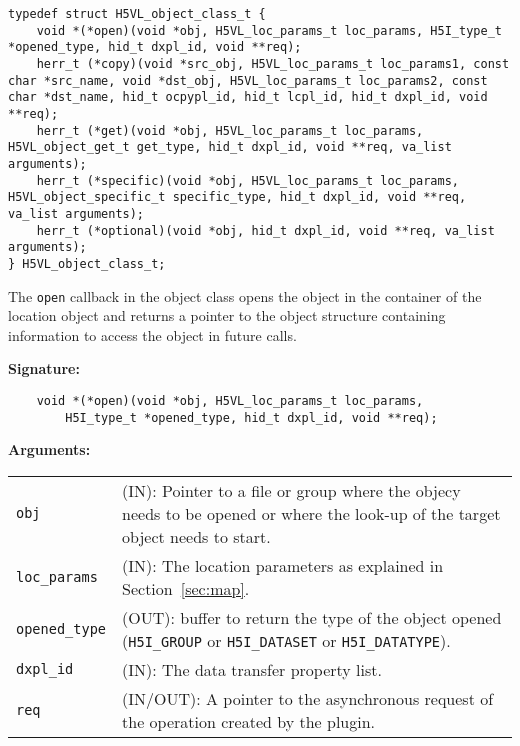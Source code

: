 \begin{lstlisting}[caption={Structure for object callback routines, H5VLpublic.h}, captionpos=b, label={lst:H5Oclass}]
typedef struct H5VL_object_class_t {
    void *(*open)(void *obj, H5VL_loc_params_t loc_params, H5I_type_t *opened_type, hid_t dxpl_id, void **req);
    herr_t (*copy)(void *src_obj, H5VL_loc_params_t loc_params1, const char *src_name, void *dst_obj, H5VL_loc_params_t loc_params2, const char *dst_name, hid_t ocpypl_id, hid_t lcpl_id, hid_t dxpl_id, void **req);
    herr_t (*get)(void *obj, H5VL_loc_params_t loc_params, H5VL_object_get_t get_type, hid_t dxpl_id, void **req, va_list arguments);
    herr_t (*specific)(void *obj, H5VL_loc_params_t loc_params, H5VL_object_specific_t specific_type, hid_t dxpl_id, void **req, va_list arguments);
    herr_t (*optional)(void *obj, hid_t dxpl_id, void **req, va_list arguments);
} H5VL_object_class_t;
\end{lstlisting}

The \texttt{open} callback in the object class opens the object in
the container of the location object and returns a pointer to the
object structure containing information to access the object in future
calls.\bigskip

\begin{mdframed}[style=bgbox]
\textbf{Signature:}
\begin{lstlisting}
    void *(*open)(void *obj, H5VL_loc_params_t loc_params, 
        H5I_type_t *opened_type, hid_t dxpl_id, void **req);
\end{lstlisting}

\textbf{Arguments:}\\
\begin{tabular}{l p{13.5cm}}
  \texttt{obj} & (IN): Pointer to a file or group where the objecy needs to be
  opened or where the look-up of the target object needs to start.\\
  \texttt{loc\_params} & (IN): The location parameters as explained in
  Section~\ref{sec:map}.\\
  \texttt{opened\_type} & (OUT): buffer to return the type of the object
  opened (\texttt{H5I\_GROUP} or \texttt{H5I\_DATASET} or \texttt{H5I\_DATATYPE}).\\
  \texttt{dxpl\_id} & (IN): The data transfer property list.\\
  \texttt{req} & (IN/OUT): A pointer to the asynchronous request of the
  operation created by the plugin.\\
\end{tabular}
\end{mdframed}


